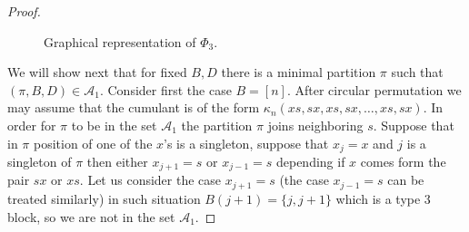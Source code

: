 \documentclass{amsart}
\newcommand{\cA}{\mathcal{A}}
\begin{document}
\begin{proof}
\begin{center}
\begin{figure}[H]
    	\caption{Graphical representation of $\Phi_3$.}
    	\label{fig:7}
    \end{figure}
    \end{center}
    
    
    We will show next that for fixed $B,D$ there is a minimal partition $\pi$ such that $(\pi,B,D)\in \cA_1$. Consider first the case $B=[n]$. After circular permutation we may assume that the cumulant is of the form $\kappa_{n}(xs,sx,xs,sx,\ldots,xs,sx)$. In order for $\pi$ to be in the set $\cA_1$ the partition $\pi$ joins neighboring $s$. Suppose that in $\pi$ position of one of the $x$'s is a singleton, suppose that $x_j=x$ and $j$ is a singleton of $\pi$ then either $x_{j+1}=s$ or $x_{j-1}=s$ depending if $x$ comes form the pair $sx$ or $xs$. Let us consider the case $x_{j+1}=s$ (the case $x_{j-1}=s$ can be treated similarly) in such situation $B(j+1)=\{j,j+1\}$ which is a type 3 block, so we are not in the set $\cA_1$.
    

\end{proof}
\end{document}
